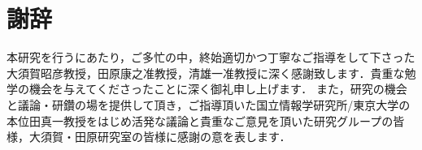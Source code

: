 \chapter*{謝辞}
本研究を行うにあたり，ご多忙の中，終始適切かつ丁寧なご指導をして下さった大須賀昭彦教授，田原康之准教授，清雄一准教授に深く感謝致します．貴重な勉学の機会を与えてくださったことに深く御礼申し上げます．
また，研究の機会と議論・研鑽の場を提供して頂き，ご指導頂いた国立情報学研究所/東京大学の本位田真一教授をはじめ活発な議論と貴重なご意見を頂いた研究グループの皆様，大須賀・田原研究室の皆様に感謝の意を表します．




